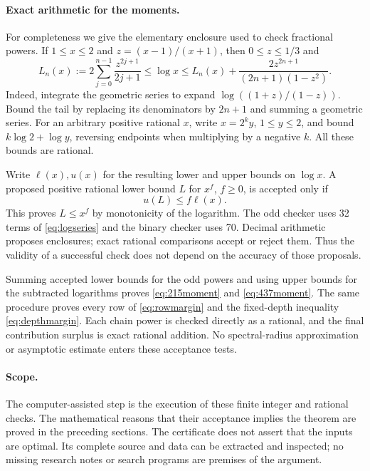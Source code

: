 \documentclass[11pt]{article}
\theoremstyle{definition}
\theoremstyle{remark}
\begin{document}
\paragraph{Exact arithmetic for the moments.}
For completeness we give the elementary enclosure used to check fractional
powers. If $1\le x\le2$ and $z=(x-1)/(x+1)$, then $0\le z\le1/3$ and
\begin{equation}\label{eq:logseries}
 L_n(x):=2\sum_{j=0}^{n-1}\frac{z^{2j+1}}{2j+1}
 \le\log x\le
 L_n(x)+\frac{2z^{2n+1}}{(2n+1)(1-z^2)}.
\end{equation}
Indeed, integrate the geometric series to expand
$\log((1+z)/(1-z))$. Bound the tail by replacing its denominators by
$2n+1$ and summing a geometric series. For an arbitrary positive rational
$x$, write $x=2^k y$, $1\le y\le2$, and bound
$k\log2+\log y$, reversing endpoints when multiplying by a negative $k$.
All these bounds are rational.

Write $\ell(x),u(x)$ for the resulting lower and upper bounds on
$\log x$. A proposed positive rational lower bound $L$ for $x^f$, $f\ge0$,
is accepted only if
\[
 u(L)\le f\ell(x).
\]
This proves $L\le x^f$ by monotonicity of the logarithm.
The odd checker uses 32 terms of \eqref{eq:logseries} and the binary
checker uses 70. Decimal arithmetic proposes enclosures; exact rational
comparisons accept or reject them. Thus the validity of a successful check
does not depend on the accuracy of those proposals.

Summing accepted lower bounds for the odd powers and using upper bounds
for the subtracted logarithms proves \eqref{eq:215moment} and
\eqref{eq:437moment}. The same procedure proves every row of
\eqref{eq:rowmargin} and the fixed-depth inequality
\eqref{eq:depthmargin}. Each chain power is checked directly as a rational,
and the final contribution surplus is exact rational addition.
No spectral-radius approximation or asymptotic estimate enters these
acceptance tests.

\paragraph{Scope.}
The computer-assisted step is the execution of these finite integer and
rational checks. The mathematical reasons that their acceptance implies
the theorem are proved in the preceding sections. The certificate does
not assert that the inputs are optimal. Its complete source and data can
be extracted and inspected; no missing research notes or search programs
are premises of the argument.
\end{document}
